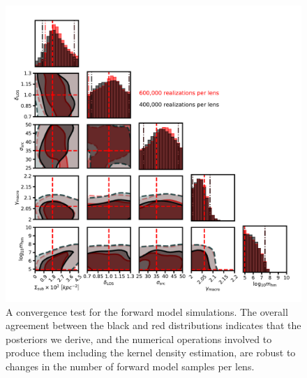 \begin{figure}
	\includegraphics[clip,trim=2cm 0cm 1cm
	0cm,width=.9\textwidth,keepaspectratio]{./figures_LOSforward/convergence_test.pdf}
	\caption[Convergence test for the posteriors from mock data]{\label{fig:convergence_test} A convergence test for the forward model simulations. The overall agreement between the black and red distributions indicates that the posteriors we derive, and the numerical operations involved to produce them including the kernel density estimation, are robust to changes in the number of forward model samples per lens.}
\end{figure}
